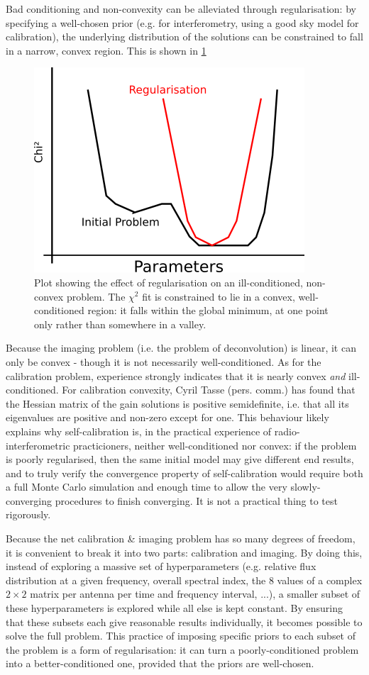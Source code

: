 \pg
Bad conditioning and non-convexity can be alleviated through regularisation: by specifying a well-chosen prior (e.g. for interferometry, using a good sky model for calibration), the underlying distribution of the solutions can be constrained to fall in a narrow, convex region. This is shown in \cref{fig.selfcal.regularise}
\begin{figure}[h!]
	\includegraphics[width=.6\linewidth]{images/regularise.png}
	\caption{\label{fig.selfcal.regularise} Plot showing the effect of regularisation on an ill-conditioned, non-convex problem. The $\chi^2$ fit is constrained to lie in a convex, well-conditioned region: it falls within the global minimum, at one point only rather than somewhere in a valley.}
\end{figure}

\pg
Because the imaging problem (i.e. the problem of deconvolution) is linear, it can only be convex - though it is not necessarily well-conditioned. As for the calibration problem, experience strongly indicates that it is nearly convex \textit{and} ill-conditioned. For calibration convexity, Cyril Tasse (pers. comm.) has found that the Hessian matrix of the gain solutions is positive semidefinite, i.e. that all its eigenvalues are positive and non-zero except for one. This behaviour likely explains why self-calibration is, in the practical experience of radio-interferometric practicioners,  neither well-conditioned nor convex: if the problem is poorly regularised, then the same initial model may give different end results, and to truly verify the convergence property of self-calibration would require both a full Monte Carlo simulation and enough time to allow the very slowly-converging procedures to finish converging. It is not a practical thing to test rigorously.

\pg
Because the net calibration \& imaging problem has so many degrees of freedom, it is convenient to break it into two parts: calibration and imaging. By doing this, instead of exploring a massive set of hyperparameters (e.g. relative flux distribution at a given frequency, overall spectral index, the 8 values of a complex $2\times 2$ matrix per antenna per time and frequency interval, ...), a smaller subset of these hyperparameters is explored while all else is kept constant. By ensuring that these subsets each give reasonable results individually, it becomes possible to solve the full problem. This practice of imposing specific priors to each subset of the problem is a form of regularisation: it can turn a poorly-conditioned problem into a better-conditioned one, provided that the priors are well-chosen.

